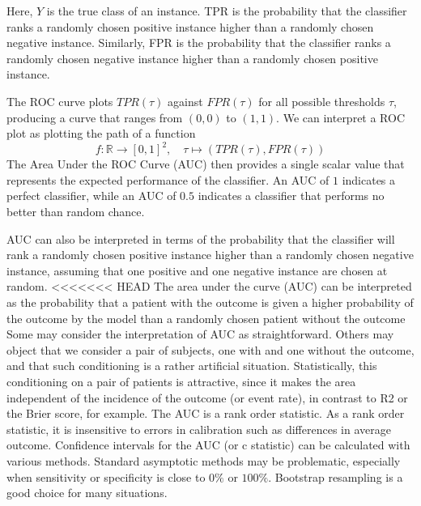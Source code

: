 	Here, $Y$ is the true class of an instance. 
	TPR is the probability that the classifier ranks a randomly chosen positive instance higher than a randomly chosen negative instance. 
	Similarly, FPR is the probability that the classifier ranks a randomly chosen negative instance higher than a randomly chosen positive instance.
    
    	
	The ROC curve plots $TPR(\tau)$ against $FPR(\tau)$ for all possible thresholds $\tau$, producing a curve that ranges from $(0,0)$ to $(1,1)$.
	We can interpret a ROC plot as plotting the path of a function
	\[
		f: \mathbb{R} \to [0,1]^2, \quad  \tau \mapsto (TPR(\tau), FPR(\tau))
	\]
	The Area Under the ROC Curve (AUC) then provides a single scalar value that represents the expected performance of the classifier.
	An AUC of $1$ indicates a perfect classifier, while an AUC of $0.5$ indicates a classifier that performs no better than random chance.
	
	AUC can also be interpreted in terms of the probability that the classifier will rank a randomly chosen positive instance higher than a randomly chosen negative instance,
	assuming that one positive and one negative instance are chosen at random.
<<<<<<< HEAD
	The area under the curve (AUC) can be interpreted as the probability that a patient with the outcome is given a higher probability of the outcome by the model
	than a randomly chosen patient without the outcome
	Some may consider the interpretation of AUC as straightforward. Others may object that we consider a pair of subjects, one with and one without the outcome, 
	and that such conditioning is a rather artificial situation. 
	Statistically, this conditioning on a pair of patients is attractive, since it makes the area independent of the incidence of the outcome (or event rate), 
	in contrast to R2 or the Brier score, for example.
	The AUC is a rank order statistic.
	As a rank order statistic, it is insensitive to errors in calibration such as differences in average outcome.
	Confidence intervals for the AUC (or c statistic) can be calculated with various methods. 
	Standard asymptotic methods may be problematic, especially when sensitivity or specificity is close to $0\%$ or $100\%$. 
	Bootstrap resampling is a good choice for many situations.
	
	
	
